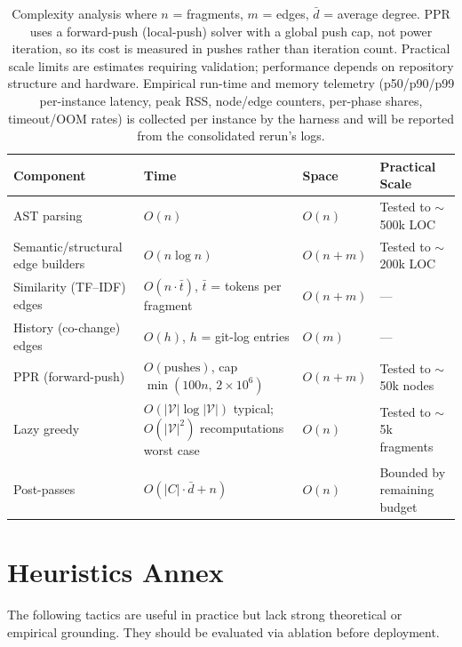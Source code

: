 \documentclass[11pt, a4paper]{article}
\begin{document}
\begin{table}[h]
\centering
\small
\begin{tabular}{p{3.6cm}p{5.2cm}lp{3.4cm}}
\toprule
\textbf{Component} & \textbf{Time} & \textbf{Space} & \textbf{Practical Scale} \\
\midrule
AST parsing & $O(n)$ & $O(n)$ & Tested to $\sim$500k LOC \\
Semantic/structural edge builders & $O(n \log n)$ & $O(n+m)$ & Tested to $\sim$200k LOC \\
Similarity (TF--IDF) edges & $O(n \cdot \bar{t})$, $\bar{t}$ = tokens per fragment & $O(n+m)$ & --- \\
History (co-change) edges & $O(h)$, $h$ = git-log entries & $O(m)$ & --- \\
PPR (forward-push) & $O(\mathrm{pushes})$, cap $\min(100n,\,2{\times}10^6)$ & $O(n+m)$ & Tested to $\sim$50k nodes \\
Lazy greedy & $O(|\mathcal{V}| \log |\mathcal{V}|)$ typical; $O(|\mathcal{V}|^2)$ recomputations worst case & $O(n)$ & Tested to $\sim$5k fragments \\
Post-passes & $O(|C| \cdot \bar{d} + n)$ & $O(n)$ & Bounded by remaining budget \\
\bottomrule
\end{tabular}
\caption{Complexity analysis where $n$ = fragments, $m$ = edges, $\bar{d}$ = average degree. PPR uses a forward-push (local-push) solver with a global push cap, not power iteration, so its cost is measured in pushes rather than iteration count. Practical scale limits are estimates requiring validation; performance depends on repository structure and hardware. Empirical run-time and memory telemetry (p50/p90/p99 per-instance latency, peak RSS, node/edge counters, per-phase shares, timeout/OOM rates) is collected per instance by the harness and will be reported from the consolidated rerun's logs.}
\end{table}

\newpage
\section{Heuristics Annex}

The following tactics are useful in practice but lack strong theoretical or empirical grounding. They should be evaluated via ablation before deployment.
\end{document}
